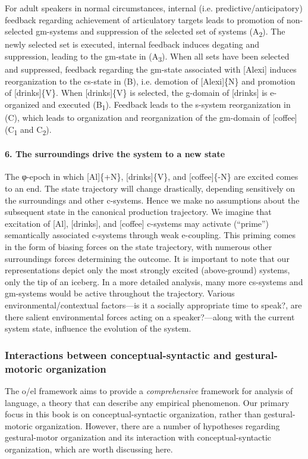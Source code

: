   For adult speakers in normal circumstances, internal (i.e. predictive/anticipatory) feedback regarding achievement of articulatory targets leads to promotion of non-selected gm-systems and suppression of the selected set of systems (A\textsubscript{2}). The newly selected set is executed, internal feedback induces degating and suppression, leading to the gm-state in (A\textsubscript{3}). When all sets have been selected and suppressed, feedback regarding the gm-state associated with [Alexi] induces reorganization to the cs-state in (B), i.e. demotion of [Alexi]\{N\} and promotion of [drinks]\{V\}. When [drinks]\{V\} is selected, the g-domain of [drinks] is e-organized and executed (B\textsubscript{1}). Feedback leads to the s-system reorganization in (C), which leads to organization and reorganization of the gm-domain of [coffee] (C\textsubscript{1} and C\textsubscript{2}).

\paragraph{6. The surroundings drive the system to a new state}

The φ-epoch in which [Al]\{+N\}, [drinks]\{V\}, and [coffee]\{-N\} are excited comes to an end. The state trajectory will change drastically, depending sensitively on the surroundings and other c-systems. Hence we make no assumptions about the subsequent state in the canonical production trajectory. We imagine that excitation of [Al], [drinks], and [coffee] c-systems may activate (“prime”) semantically associated c-systems through weak e-coupling. This priming comes in the form of biasing forces on the state trajectory, with numerous other surroundings forces determining the outcome. It is important to note that our representations depict only the most strongly excited (above-ground) systems, only the tip of an iceberg. In a more detailed analysis, many more cs-systems and gm-systems would be active throughout the trajectory. Various environmental/contextual factors—is it a socially appropriate time to speak?, are there salient environmental forces acting on a speaker?—along with the current system state, influence the evolution of the system. 

\subsubsection{Interactions between conceptual-syntactic and gestural-motoric organization}

The o/el framework aims to provide a \textit{comprehensive} framework for analysis of language, a theory that can describe any empirical phenomenon. Our primary focus in this book is on conceptual-syntactic organization, rather than gestural-motoric organization. However, there are a number of hypotheses regarding gestural-motor organization and its interaction with conceptual-syntactic organization, which are worth discussing here.

